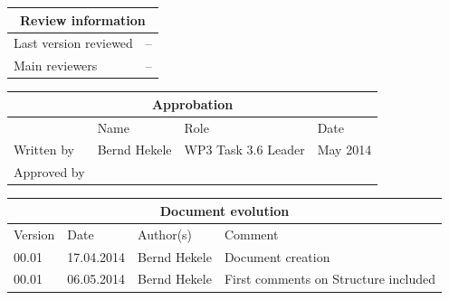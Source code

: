 \documentclass{template/openetcs_report}
\begin{document}
\begin{tabular}{|p{4.4cm}|p{8.7cm}|}
\hline
\multicolumn{2}{|c|}{Review information} \\
\hline
Last version reviewed & -- \\
\hline
Main reviewers & -- \\
\hline
\end{tabular}

\begin{tabular}{|p{2.2cm}|p{4cm}|p{4cm}|p{2cm}|}
\hline
\multicolumn{4}{|c|}{Approbation} \\
\hline
  &  Name & Role & Date   \\
\hline  
Written by    &  Bernd Hekele & WP3 Task 3.6 Leader  & May 2014\\
\hline
Approved by &  &  &  \\
\hline
\end{tabular}

\begin{tabular}{|p{1.5cm}|p{2cm}|p{3.5cm}|p{6cm}|}
\hline
\multicolumn{4}{|c|}{Document evolution} \\
\hline
Version &  Date & Author(s) & Comment  \\
\hline  
00.01 & 17.04.2014 & Bernd Hekele &  Document creation
\\\hline  
00.01 & 06.05.2014 & Bernd Hekele &  First comments on Structure included
\\\hline
\end{tabular}




\mainmatter
\end{document}
